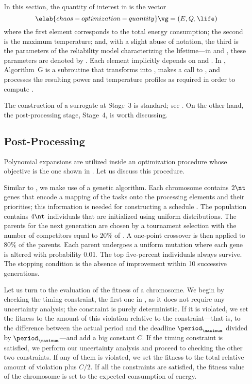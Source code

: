 In this section, the quantity of interest \g in  is the
vector
\begin{equation} \elab{chaos-optimization-quantity}
  \vg = (E, Q, \life)
\end{equation}
where the first element corresponds to the total energy consumption; the second
is the maximum temperature; and, with a slight abuse of notation, the third is
the parameters of the reliability model characterizing the lifetime---in
 and , these parameters
are denoted by \vg. Each element implicitly depends on \schedule and \vu. In
, Algorithm~G is a subroutine that transforms \vz into
\vu, makes a call to , and
processes the resulting power and temperature profiles as required in order to
compute \vg.

The construction of a surrogate at Stage~3 is standard; see
. On the other hand, the post-processing stage,
Stage~4, is worth discussing.

\subsection{Post-Processing}

Polynomial expansions are utilized inside an optimization procedure whose
objective is the one shown in . Let us
discuss this procedure.

Similar to , we make use of a genetic algorithm. Each
chromosome contains $2 \nt$ genes that encode a mapping of the tasks onto the
processing elements and their priorities; this information is needed for
constructing a schedule \schedule. The population contains $4 \nt$ individuals
that are initialized using uniform distributions. The parents for the next
generation are chosen by a tournament selection with the number of competitors
equal to 20\% of \nt. A one-point crossover is then applied to 80\% of the
parents. Each parent undergoes a uniform mutation where each gene is altered
with probability 0.01. The top five-percent individuals always survive. The
stopping condition is the absence of improvement within 10 successive
generations.

Let us turn to the evaluation of the fitness of a chromosome. We begin by
checking the timing constraint, the first one in
, as it does not require any uncertainty
analysis; the constraint is purely deterministic. If it is violated, we set the
fitness to the amount of this violation relative to the constraint---that is, to
the difference between the actual period and the deadline $\period_\maximum$
divided by $\period_\maximum$---and add a big constant $C$. If the timing
constraint is satisfied, we perform our uncertainty analysis and proceed to
checking the other two constraints. If any of them is violated, we set the
fitness to the total relative amount of violation plus $C / 2$. If all the
constraints are satisfied, the fitness value of the chromosome is set to the
expected consumption of energy.

